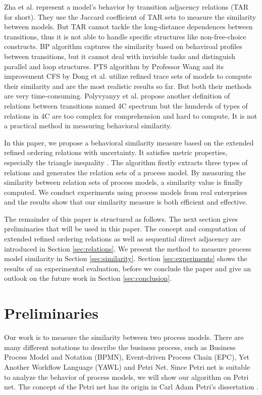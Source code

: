 \documentclass[dvips,...]{llncs}
\begin{document}
Zha et al. \cite{zha2010workflow} represent a model's behavior by transition adjacency relations (TAR for short). They use the Jaccard coefficient of TAR sets to measure the similarity between models. But TAR cannot tackle the long-distance dependences between transitions, thus it is not able to handle specific structures like non-free-choice constructs. BP algorithm \cite{weidlich2011efficient} captures the similarity based on behaviroal profiles between transitions, but it cannot deal with invisible tasks and distinguish parallel and loop structures. PTS algorithm by Professor Wang \cite{wang2010behavioral} and its improvement CFS by Dong et al. \cite{dong2014cfs} utilize refined trace sets of models to compute their similarity and are the most realistic results so far. But both their methods are very time-consuming. Polyvyanyy et al. \cite{polyvyanyy20144c} propose another definition of relations between transitions named 4C spectrum but the hunderds of types of relations in 4C are too complex for comprehension and hard to compute. It is not a practical method in measuring behavioral similarity.

In this paper, we propose a behavioral similarity measure based on the extended refined ordering relations with uncertainty. It satisfies metric properties, especially the triangle inequality \cite{zezula2006similarity}. The algorithm firstly extracts three types of relations and generates the relation sets of a process model. By measuring the similarity between relation sets of process models, a similarity value is finally computed. We conduct experiments using process models from real enterprises and the results show that our similarity measure is both efficient and effective.

The remainder of this paper is structured as follows. The next section gives preliminaries that will be used in this paper. The concept and computation of extended refined ordering relations as well as sequential direct adjacency are introduced in Section \ref{sec:relations}. We present the method to measure process model similarity in Section \ref{sec:similarity}. Section \ref{sec:experiments} shows the results of an experimental evaluation, before we conclude the paper and give an outlook on the future work in Section \ref{sec:conclusion}.

\section{Preliminaries}\label{sec:preliminaries}
Our work is to measure the similarity between two process models. There are many different notations to describe the business process, such as Business Process Model and Notation (BPMN), Event-driven Process Chain (EPC), Yet Another Workflow Language (YAWL) and Petri Net. Since Petri net is suitable to analyze the behavior of process models, we will show our algorithm on Petri net. The concept of the Petri net has its origin in Carl Adam Petri's dissertation \cite{petri1966kommunikation}.
\end{document}
